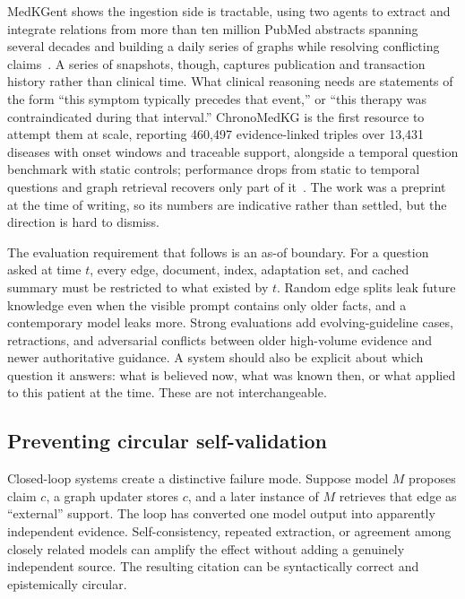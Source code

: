 MedKGent shows the ingestion side is tractable, using two agents to extract and integrate relations from more than ten million PubMed abstracts spanning several decades and building a daily series of graphs while resolving conflicting claims~\cite{zhang2025medkgent}. A series of snapshots, though, captures publication and transaction history rather than clinical time. What clinical reasoning needs are statements of the form ``this symptom typically precedes that event,'' or ``this therapy was contraindicated during that interval.'' ChronoMedKG is the first resource to attempt them at scale, reporting 460{,}497 evidence-linked triples over 13{,}431 diseases with onset windows and traceable support, alongside a temporal question benchmark with static controls; performance drops from static to temporal questions and graph retrieval recovers only part of it~\cite{ahmed2026chronomedkg}. The work was a preprint at the time of writing, so its numbers are indicative rather than settled, but the direction is hard to dismiss.

The evaluation requirement that follows is an as-of boundary. For a question asked at time $t$, every edge, document, index, adaptation set, and cached summary must be restricted to what existed by $t$. Random edge splits leak future knowledge even when the visible prompt contains only older facts, and a contemporary model leaks more. Strong evaluations add evolving-guideline cases, retractions, and adversarial conflicts between older high-volume evidence and newer authoritative guidance. A system should also be explicit about which question it answers: what is believed now, what was known then, or what applied to this patient at the time. These are not interchangeable.

\subsection{Preventing circular self-validation}

Closed-loop systems create a distinctive failure mode. Suppose model $M$ proposes claim $c$, a graph updater stores $c$, and a later instance of $M$ retrieves that edge as ``external'' support. The loop has converted one model output into apparently independent evidence. Self-consistency, repeated extraction, or agreement among closely related models can amplify the effect without adding a genuinely independent source. The resulting citation can be syntactically correct and epistemically circular.

